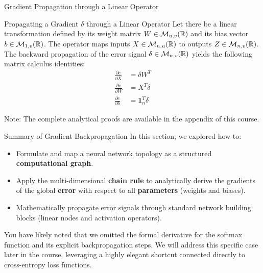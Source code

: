 \begin{frame}{Gradient Propagation through a Linear Operator}
	\begin{block}{Propagating a Gradient $\delta$ through a Linear Operator}
		Let there be a linear transformation defined by its weight matrix $W \in \mathcal{M}_{u,v}(\mathbb{R})$ and its bias vector $b \in \mathcal{M}_{1,v}(\mathbb{R})$. The operator maps inputs $X \in \mathcal{M}_{n,u}(\mathbb{R})$ to outputs $Z \in \mathcal{M}_{n,v}(\mathbb{R})$. The backward propagation of the error signal $\delta \in \mathcal{M}_{n,v}(\mathbb{R})$ yields the following matrix calculus identities:
		\begin{equation*}
			\begin{aligned}
				\frac{\partial{e}}{\partial{X}} &= \delta W^T \\
				\frac{\partial{e}}{\partial{W}} &=  X^T \delta \\
				\frac{\partial{e}}{\partial{b}} &= \mathbf{1}_n^T \delta    
			\end{aligned}
		\end{equation*} 
	\end{block}
	Note: The complete analytical proofs are available in the appendix of this course.
\end{frame}

\begin{frame}{Summary of Gradient Backpropagation}
	In this section, we explored how to:
	\begin{itemize}
		\item Formulate and map a neural network topology as a structured \textbf{computational graph}.
		\item Apply the multi-dimensional \textbf{chain rule} to analytically derive the gradients of the global \textbf{error} with respect to all \textbf{parameters} (weights and biases).
		\item Mathematically propagate error signals through standard network building blocks (linear nodes and activation operators). 
	\end{itemize}
	\pause
	You have likely noted that we omitted the formal derivative for the softmax function and its explicit backpropagation steps. We will address this specific case later in the course, leveraging a highly elegant shortcut connected directly to cross-entropy loss functions.
\end{frame}